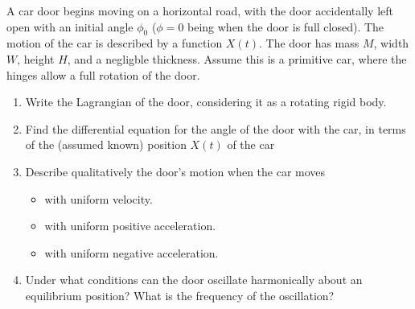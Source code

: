 \documentclass{jhwhw}
\begin{document}
A car door begins moving on a horizontal road, with the door accidentally left open with an initial angle $\phi_{0}$ ($\phi=0$ being when the door is full closed).
The motion of the car is described by a function $X(t)$.
The door has mass $M$, width $W$, height $H$, and a negligble thickness.
Assume this is a primitive car, where the hinges allow a full rotation of the door.
\begin{enumerate}
  \item Write the Lagrangian of the door, considering it as a rotating rigid body.
  \item Find the differential equation for the angle of the door with the car, in terms of the (assumed known) position $X(t)$ of the car
  \item Describe qualitatively the door's motion when the car moves
        \begin{itemize}
          \item with uniform velocity.
          \item with uniform positive acceleration.
          \item with uniform negative acceleration.
        \end{itemize}
  \item Under what conditions can the door oscillate harmonically about an equilibrium position? What is the frequency of the oscillation?
\end{enumerate}
\end{document}
